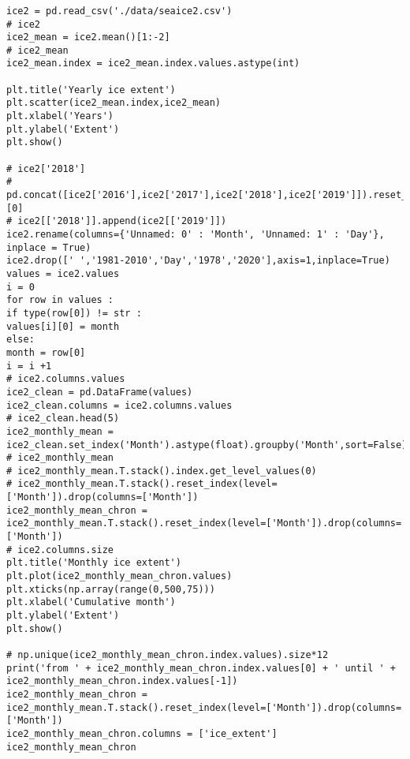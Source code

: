 \chapter{}
\label{ch:methodologie}

\label{}
\begin{verbatim}

ice2 = pd.read_csv('./data/seaice2.csv')
# ice2
ice2_mean = ice2.mean()[1:-2]
# ice2_mean
ice2_mean.index = ice2_mean.index.values.astype(int)

plt.title('Yearly ice extent')
plt.scatter(ice2_mean.index,ice2_mean)
plt.xlabel('Years')
plt.ylabel('Extent')
plt.show()

# ice2['2018']
# pd.concat([ice2['2016'],ice2['2017'],ice2['2018'],ice2['2019']]).reset_index()[0]
# ice2[['2018']].append(ice2[['2019']])
ice2.rename(columns={'Unnamed: 0' : 'Month', 'Unnamed: 1' : 'Day'}, inplace = True)
ice2.drop([' ','1981-2010','Day','1978','2020'],axis=1,inplace=True)
values = ice2.values
i = 0
for row in values :
if type(row[0]) != str :
values[i][0] = month
else:
month = row[0]
i = i +1
# ice2.columns.values
ice2_clean = pd.DataFrame(values)
ice2_clean.columns = ice2.columns.values
# ice2_clean.head(5)
ice2_monthly_mean = ice2_clean.set_index('Month').astype(float).groupby('Month',sort=False).mean()
# ice2_monthly_mean
# ice2_monthly_mean.T.stack().index.get_level_values(0)
# ice2_monthly_mean.T.stack().reset_index(level=['Month']).drop(columns=['Month'])
ice2_monthly_mean_chron = ice2_monthly_mean.T.stack().reset_index(level=['Month']).drop(columns=['Month'])
# ice2.columns.size
plt.title('Monthly ice extent')
plt.plot(ice2_monthly_mean_chron.values)
plt.xticks(np.array(range(0,500,75)))
plt.xlabel('Cumulative month')
plt.ylabel('Extent')
plt.show()

# np.unique(ice2_monthly_mean_chron.index.values).size*12
print('from ' + ice2_monthly_mean_chron.index.values[0] + ' until ' + ice2_monthly_mean_chron.index.values[-1])
ice2_monthly_mean_chron = ice2_monthly_mean.T.stack().reset_index(level=['Month']).drop(columns=['Month'])
ice2_monthly_mean_chron.columns = ['ice_extent']
ice2_monthly_mean_chron
\end{verbatim}